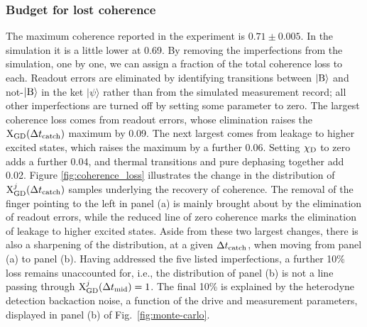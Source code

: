 \documentclass[
						superscriptaddress, 																 amsmath, amssymb,
		 aps,  prb,  
										floatfix,
		linenumbers,
			]{revtex4-1}
\begin{document}
\subsubsection{Budget for lost coherence}
\label{sec:Budget-coherence}
The maximum coherence reported in the experiment is $0.71\pm0.005$. In the simulation it is a little lower at 0.69. By removing the imperfections from the simulation, one by one, we can assign a fraction of the total coherence loss to each. Readout errors are eliminated by identifying transitions between $|{\rm B}\rangle$ and not-$|{\rm B}\rangle$ in the ket $|\psi\rangle$ rather than from the simulated measurement record; all other imperfections are turned off by setting some parameter to zero. The largest coherence loss comes from readout errors, whose elimination raises the ${\rm X}_{\rm GD}(\Delta t_{\rm catch})$ maximum by 0.09. The next largest comes from leakage to higher excited states, which raises the maximum by a further 0.06. Setting $\chi_{\rm D}$ to zero adds a further 0.04, and thermal transitions and pure dephasing together add 0.02. Figure \ref{fig:coherence_loss} illustrates the change in the distribution of ${\rm X}_{\rm GD}^j(\Delta t_{\rm catch})$ samples underlying the recovery of coherence. The removal of the finger pointing to the left in panel (a) is mainly brought about by the elimination of readout errors, while the reduced line of zero coherence marks the elimination of leakage to higher excited states. Aside from these two largest changes, there is also a sharpening of the distribution, at a given $\Delta t_{\rm catch}$, when moving from panel (a) to panel (b). Having addressed the five listed imperfections, a further 10\% loss remains unaccounted for, i.e., the distribution of panel (b) is not a line passing through ${\rm X}_{\rm GD}^j(\Delta t_{\rm mid})=1$. The final 10\% is explained by the heterodyne detection backaction noise,  a function of the drive and measurement parameters, displayed in panel (b) of Fig.~\ref{fig:monte-carlo}.
\end{document}
